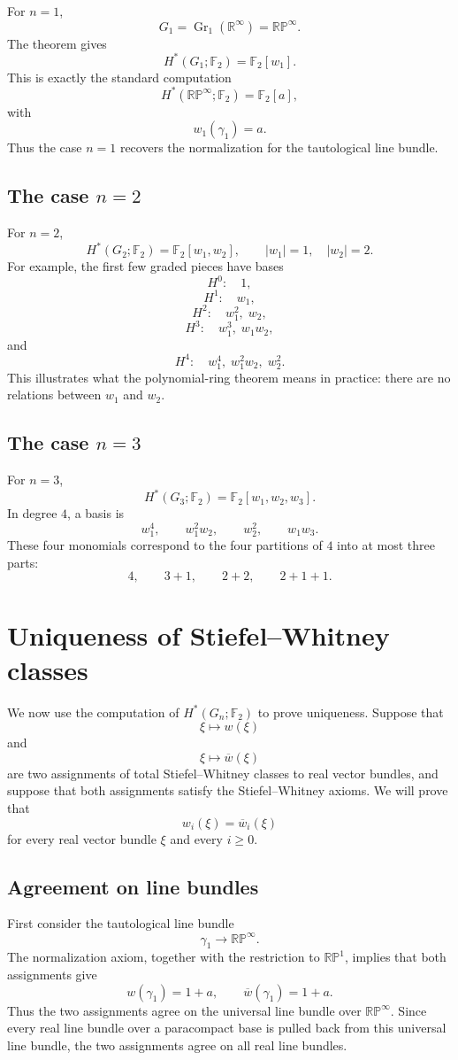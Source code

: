 \documentclass[11pt]{article}
\newcommand{\F}{\mathbb F}
\newcommand{\R}{\mathbb R}
\newcommand{\RP}{\mathbb{RP}}
\newcommand{\Gr}{\operatorname{Gr}}
\theoremstyle{plain}
\theoremstyle{definition}
\numberwithin{equation}{section}
\begin{document}
For $n=1$,
\[
  G_1=\Gr_1(\R^\infty)=\RP^\infty.
\]
The theorem gives
\[
  H^*(G_1;\F_2)=\F_2[w_1].
\]
This is exactly the standard computation
\[
  H^*(\RP^\infty;\F_2)=\F_2[a],
\]
with
\[
  w_1(\gamma_1)=a.
\]
Thus the case $n=1$ recovers the normalization for the tautological line bundle.

\subsection{The case $n=2$}

For $n=2$,
\[
  H^*(G_2;\F_2)=\F_2[w_1,w_2],
  \qquad |w_1|=1,
  \quad |w_2|=2.
\]
For example, the first few graded pieces have bases
\[
  H^0:\quad 1,
\]
\[
  H^1:\quad w_1,
\]
\[
  H^2:\quad w_1^2,\;w_2,
\]
\[
  H^3:\quad w_1^3,\;w_1w_2,
\]
and
\[
  H^4:\quad w_1^4,\;w_1^2w_2,\;w_2^2.
\]
This illustrates what the polynomial-ring theorem means in practice: there are no relations between $w_1$ and $w_2$.

\subsection{The case $n=3$}

For $n=3$,
\[
  H^*(G_3;\F_2)=\F_2[w_1,w_2,w_3].
\]
In degree $4$, a basis is
\[
  w_1^4,
  \qquad
  w_1^2w_2,
  \qquad
  w_2^2,
  \qquad
  w_1w_3.
\]
These four monomials correspond to the four partitions of $4$ into at most three parts:
\[
  4,
  \qquad
  3+1,
  \qquad
  2+2,
  \qquad
  2+1+1.
\]

\section{Uniqueness of Stiefel--Whitney classes}

We now use the computation of $H^*(G_n;\F_2)$ to prove uniqueness.  Suppose that
\[
  \xi\longmapsto w(\xi)
\]
and
\[
  \xi\longmapsto \overline w(\xi)
\]
are two assignments of total Stiefel--Whitney classes to real vector bundles, and suppose that both assignments satisfy the Stiefel--Whitney axioms.  We will prove that
\[
  w_i(\xi)=\overline w_i(\xi)
\]
for every real vector bundle $\xi$ and every $i\geq 0$.

\subsection{Agreement on line bundles}

First consider the tautological line bundle
\[
  \gamma_1\to\RP^\infty.
\]
The normalization axiom, together with the restriction to $\RP^1$, implies that both assignments give
\[
  w(\gamma_1)=1+a,
  \qquad
  \overline w(\gamma_1)=1+a.
\]
Thus the two assignments agree on the universal line bundle over $\RP^\infty$.  Since every real line bundle over a paracompact base is pulled back from this universal line bundle, the two assignments agree on all real line bundles.
\end{document}
